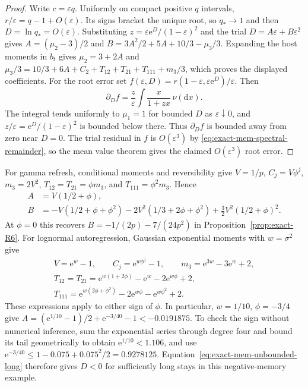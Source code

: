 \begin{proof}
Write $c=\varepsilon q$. Uniformly on compact positive $q$ intervals,
$r/\varepsilon=q-1+O(\varepsilon)$. Its signs bracket the unique root,
so $q_*\to1$ and then $D=\ln q_*=O(\varepsilon)$.
Substituting $z=\varepsilon\mathrm e^D/(1-\varepsilon)^2$ and the
trial $D=A\varepsilon+B\varepsilon^2$ gives
$A=(\mu_2-3)/2$ and
$B=3A^2/2+5A+10/3-\mu_3/3$.
Expanding the host moments in $b_t$ gives
$\mu_2=3+2A$ and
$\mu_3/3=10/3+6A+C_2+T_{12}+T_{21}+T_{111}+m_3/3$,
which proves the displayed coefficients.
For the root error set
$f(\varepsilon,D)=r(1-\varepsilon,\varepsilon\mathrm e^D)/\varepsilon$.
Then
\begin{equation}
 \partial_D f=\frac{z}{\varepsilon}
       \int\frac{x}{1+zx}\,\nu(\mathrm d x).
 \label{eq:exact-mem-root-slope}
\end{equation}
The integral tends uniformly to $\mu_1=1$ for bounded $D$ as
$\varepsilon\downarrow0$, and $z/\varepsilon=
\mathrm e^D/(1-\varepsilon)^2$ is bounded below there.
Thus $\partial_D f$ is bounded away from zero near $D=0$.
The trial residual in $f$ is $O(\varepsilon^3)$ by
\eqref{eq:exact-mem-spectral-remainder}, so the mean value theorem
gives the claimed $O(\varepsilon^3)$ root error.
\end{proof}

For gamma refresh, conditional moments and reversibility give
$V=1/p$, $C_j=V\phi^j$, $m_3=2V^2$,
$T_{12}=T_{21}=\phi m_3$, and $T_{111}=\phi^2m_3$. Hence
\begin{equation}
\begin{split}
 A&=V(1/2+\phi),\\
 B&=-V(1/2+\phi+\phi^2)-2V^2(1/3+2\phi+\phi^2)
       +\tfrac32V^2(1/2+\phi)^2.
\end{split}
 \label{eq:exact-mem-refresh-coefficients}
\end{equation}
At $\phi=0$ this recovers $B=-1/(2p)-7/(24p^2)$ in
Proposition~\ref{prop:exact-R6}. For lognormal autoregression,
Gaussian exponential moments with $w=\sigma^2$ give
\begin{equation}
\begin{gathered}
 V=\mathrm e^w-1,\qquad C_j=\mathrm e^{w\phi^j}-1,\qquad
 m_3=\mathrm e^{3w}-3\mathrm e^w+2,\\
 T_{12}=T_{21}=\mathrm e^{w(1+2\phi)}-\mathrm e^w-2\mathrm e^{w\phi}+2,\\
 T_{111}=\mathrm e^{w(2\phi+\phi^2)}-2\mathrm e^{w\phi}
                 -\mathrm e^{w\phi^2}+2.
 \label{eq:exact-mem-lognormal-moments}
\end{gathered}
\end{equation}
These expressions apply to either sign of $\phi$. In particular,
$w=1/10$, $\phi=-3/4$ give
$A=(\mathrm e^{1/10}-1)/2+\mathrm e^{-3/40}-1<-0.0191875$.
To check the sign without numerical inference, sum the exponential
series through degree four and bound its tail geometrically to obtain
$\mathrm e^{1/10}<1.106$, and use
$\mathrm e^{-3/40}\leq1-0.075+0.075^2/2=0.9278125$.
Equation~\eqref{eq:exact-mem-unbounded-long} therefore gives $D<0$
for sufficiently long stays in this negative-memory example.


